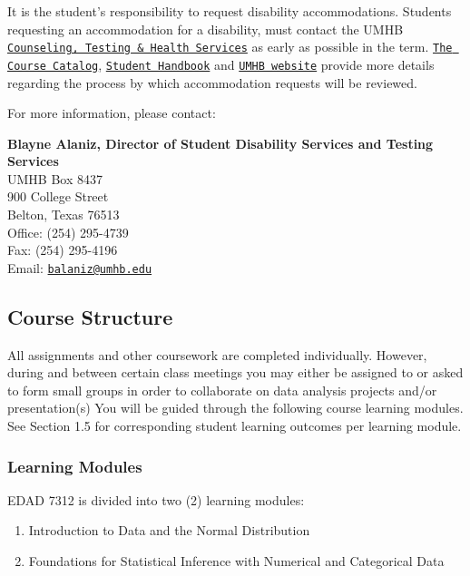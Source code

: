 \documentclass[
]{article}
\providecommand{\tightlist}{%
  \setlength{\itemsep}{0pt}\setlength{\parskip}{0pt}}
\begin{document}
It is the student's responsibility to request disability accommodations.
Students requesting an accommodation for a disability, must contact the
UMHB
\href{http://cths.umhb.edu/disability}{\texttt{Counseling, Testing \& Health Services}}
as early as possible in the term.
\href{http://catalog.umhb.edu/en/2019-2020/Graduate-Catalog}{\texttt{The Course Catalog}},
\href{http://students.umhb.edu/student-handbook}{\texttt{Student Handbook}}
and \href{https://go.umhb.edu/}{\texttt{UMHB website}} provide more
details regarding the process by which accommodation requests will be
reviewed.

For more information, please contact:

\textbf{Blayne Alaniz, Director of Student Disability Services and
Testing Services}\\
UMHB Box 8437\\
900 College Street\\
Belton, Texas 76513\\
Office: (254) 295-4739\\
Fax: (254) 295-4196\\
Email: \texttt{\href{mailto:balaniz@umhb.edu}{balaniz@umhb.edu}}

\subsection{Course Structure}

All assignments and other coursework are completed individually.
However, during and between certain class meetings you may either be
assigned to or asked to form small groups in order to collaborate on
data analysis projects and/or presentation(s) You will be guided through
the following course learning modules. See Section 1.5 for corresponding
student learning outcomes per learning module.

\subsubsection{Learning Modules}

EDAD 7312 is divided into two (2) learning modules:

\begin{enumerate}
\def\labelenumi{\arabic{enumi}.}
\tightlist
\item
  Introduction to Data and the Normal Distribution
\item
  Foundations for Statistical Inference with Numerical and Categorical
  Data
\end{enumerate}
\end{document}
